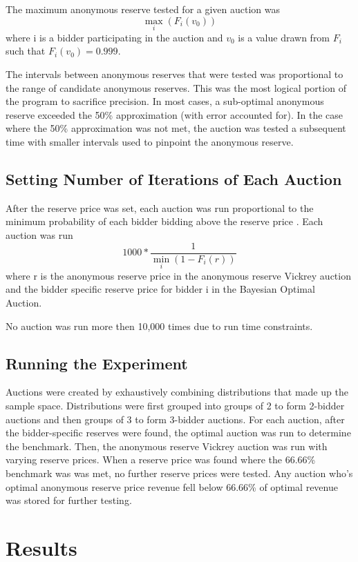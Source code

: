 \documentclass{acm_proc_article-sp}
\begin{document}
	 The maximum anonymous reserve tested for a given auction was \[\max_{i}(F_i(v_0))\] where i is a bidder participating in the auction and $v_0$ is a value drawn from $F_i$ such that $F_i(v_0) = 0.999$.
	 
	The intervals between anonymous reserves that were tested was proportional to the range of candidate anonymous reserves. This was the most logical portion of the program to sacrifice precision. In most cases, a sub-optimal anonymous reserve exceeded the 50\% approximation (with error accounted for). In the case where the 50\% approximation was not met, the auction was tested a subsequent time with smaller intervals used to pinpoint the anonymous reserve. 
 
\subsection{Setting Number of Iterations of Each Auction}

After the reserve price was set, each auction was run proportional to the minimum probability of each bidder bidding above the reserve price . Each auction was run \[1000 *\frac{1}{\min_{i}(1- F_i(r))}\] where r is the anonymous reserve price in the anonymous reserve Vickrey auction and the bidder specific reserve price for bidder i in the Bayesian Optimal Auction.

No auction was run more then 10,000 times due to run time constraints. 

\subsection{Running the Experiment}

Auctions were created by exhaustively combining distributions that made up the sample space. Distributions were first grouped into groups of 2 to form 2-bidder auctions and then groups of 3 to form 3-bidder auctions. For each auction, after the bidder-specific reserves were found, the optimal auction was run to determine the benchmark. Then, the anonymous reserve Vickrey auction was run with varying reserve prices. When a reserve price was found where the 66.66\% benchmark was was met, no further reserve prices were tested. Any auction who's optimal anonymous reserve price revenue fell below 66.66\% of optimal revenue was stored for further testing.

\section{Results}
\end{document}
